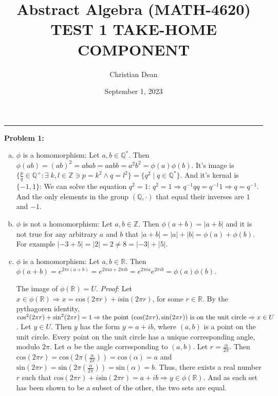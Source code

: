 \documentclass[12pt, letterpaper]{article}
\title{Abstract Algebra (MATH-4620) TEST 1 TAKE-HOME COMPONENT}
\author{Christian Dean}
\date{September 1, 2023}
\newenvironment{problem}
    [1]
    {\noindent \textbf{Problem #1:}}
    {\vspace{3mm}}
\begin{document}
\maketitle

\noindent\hfil\rule{16cm}{0.4pt}\hfil

\begin{problem}{1}
    \begin{enumerate}[(a)]
        \item $\phi$ is a homomorphism: Let $a, b \in \mathbb{Q}^*$. Then $\phi(ab) = (ab)^2 = 
        abab = aabb = a^2b^2 = \phi(a)\phi(b)$. It's image is $\{\frac{p}{q} \in \mathbb{Q}^+ : 
        \exists \; k, l \in \mathbb{Z} \ni p = k^2 \land q = l^2\} = \{q^2 \;|\; q \in \mathbb{Q}^*\}$. 
        And it's kernal is $\{-1, 1\}$: We can solve the equation $q^2 = 1$: $q^2 = 1 \Rightarrow 
        q^{-1}qq = q^{-1}1 \Rightarrow q = q^{-1}$. And the only elements in the group $(\mathbb{Q},
        \cdot)$ that equal their inverses are $1$ and $-1$.

        \item $\phi$ is not a homomorphism: Let $a, b \in \mathbb{Z}$. Then $\phi(a + b) = 
        |a + b|$ and it is not true for any arbitrary $a$ and $b$ that $|a + b| = |a| + |b|
        = \phi(a) + \phi(b)$. For example $|-3 + 5|  = |2| = 2 \neq 8 = |-3| + |5|$.

        \item $\phi$ is a homomorphism: Let $a, b \in \mathbb{R}$. Then $\phi(a + b) = 
        e^{2\pi i(a + b)} = e^{2\pi ia + 2\pi ib} = e^{2\pi ia}e^{2\pi ib} = \phi(a)\phi(b)$.

        \bigskip\noindent
        The image of $\phi(\mathbb{R}) = U$. \emph{Proof}: Let $x \in \phi(\mathbb{R}) 
        \Rightarrow x = \text{cos}(2\pi r) + i\text{sin}(2\pi r)$, for some $r \in \mathbb{R}$. 
        By the pythagoren identity, $\text{cos}^2(2\pi r) + \text{sin}^2(2\pi r) = 1 \Rightarrow
        \text{the point } (\text{cos}(2\pi r), \\ \text{sin}(2\pi r)) \text{ is on the unit circle} 
        \Rightarrow x \in U$. Let $y \in U$. Then $y$ has the form $y = a + ib$, where $(a, b)$ is a 
        point on the unit circle. Every point on the unit circle has a unique corresponding angle, 
        modulo $2\pi$. Let $\alpha$ be the angle corresponding to $(a, b)$. Let $r = \frac{\alpha}{2\pi}$. 
        Then $\text{cos}(2\pi r) = \text{cos}(2\pi(\frac{\alpha}{2\pi})) = \text{cos}(\alpha) = a$ 
        and $\text{sin}(2\pi r) = \text{sin}(2\pi(\frac{\alpha}{2\pi})) = \text{sin}(\alpha) = b$. 
        Thus, there exists a real number $r$ such that $\text{cos}(2\pi r) + i\text{sin}(2\pi r) = 
        a + ib \Rightarrow y \in \phi(\mathbb{R})$. And as each set has been shown to be a subset
        of the other, the two sets are equal.


\end{enumerate}
\end{problem}
\end{document}
